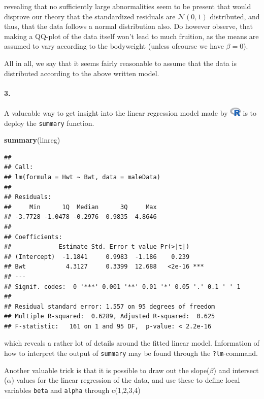 \documentclass[
]{article}
\newenvironment{Shaded}{\begin{snugshade}}{\end{snugshade}}
\newcommand{\KeywordTok}[1]{\textcolor[rgb]{0.13,0.29,0.53}{\textbf{#1}}}
\newcommand{\NormalTok}[1]{#1}
\begin{document}
revealing that no sufficiently large abnormalities seem to be present
that would disprove our theory that the standardized residuals are
\(\mathcal{N}(0,1)\) distributed, and thus, that the data follows a
normal distribution also. Do however observe, that making a QQ-plot of
the data itself won't lead to much fruition, as the means are assumed to
vary according to the bodyweight (unless ofcourse we have \(\beta=0\)).

All in all, we say that it seems fairly reasonable to assume that the
data is distributed according to the above written model.

\hypertarget{section-5}{%
\paragraph{\texorpdfstring{\textbf{3.}}{3.}}\label{section-5}}

A valueable way to get insight into the linear regression model made by
\includegraphics[width=\textwidth,height=0.16667in]{R_logo.png} is to
deploy the \texttt{summary} function.

\begin{Shaded}
\begin{Highlighting}[]
\KeywordTok{summary}\NormalTok{(linreg)}
\end{Highlighting}
\end{Shaded}

\begin{verbatim}
## 
## Call:
## lm(formula = Hwt ~ Bwt, data = maleData)
## 
## Residuals:
##     Min      1Q  Median      3Q     Max 
## -3.7728 -1.0478 -0.2976  0.9835  4.8646 
## 
## Coefficients:
##             Estimate Std. Error t value Pr(>|t|)    
## (Intercept)  -1.1841     0.9983  -1.186    0.239    
## Bwt           4.3127     0.3399  12.688   <2e-16 ***
## ---
## Signif. codes:  0 '***' 0.001 '**' 0.01 '*' 0.05 '.' 0.1 ' ' 1
## 
## Residual standard error: 1.557 on 95 degrees of freedom
## Multiple R-squared:  0.6289, Adjusted R-squared:  0.625 
## F-statistic:   161 on 1 and 95 DF,  p-value: < 2.2e-16
\end{verbatim}

which reveals a rather lot of details around the fitted linear model.
Information of how to interpret the output of \texttt{summary} may be
found through the \texttt{?lm}-command.

Another valuable trick is that it is possible to draw out the
slope(\(\beta\)) and intersect (\(\alpha\)) values for the linear
regression of the data, and use these to define local variables
\texttt{beta} and \texttt{alpha} through c(1,2,3,4)
\end{document}
